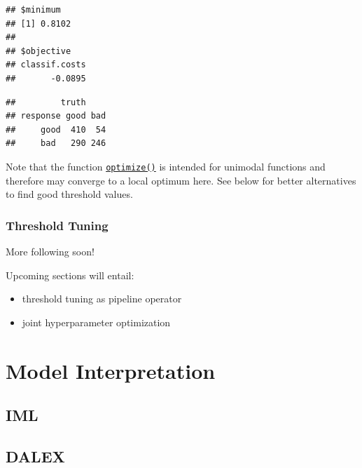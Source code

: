 \documentclass[]{scrbook}
\newenvironment{Shaded}{\begin{snugshade}}{\end{snugshade}}
\newcommand{\CommentTok}[1]{\textcolor[rgb]{0.56,0.35,0.01}{\textit{#1}}}
\newcommand{\KeywordTok}[1]{\textcolor[rgb]{0.13,0.29,0.53}{\textbf{#1}}}
\newcommand{\NormalTok}[1]{#1}
\newcommand{\OperatorTok}[1]{\textcolor[rgb]{0.81,0.36,0.00}{\textbf{#1}}}
\providecommand{\tightlist}{%
  \setlength{\itemsep}{0pt}\setlength{\parskip}{0pt}}
\renewenvironment{Shaded} {\begin{snugshade}\small} {\end{snugshade}}
\begin{document}
\begin{verbatim}
## $minimum
## [1] 0.8102
## 
## $objective
## classif.costs 
##       -0.0895
\end{verbatim}

\begin{Shaded}
\end{Shaded}

\begin{verbatim}
##         truth
## response good bad
##     good  410  54
##     bad   290 246
\end{verbatim}

Note that the function \href{https://www.rdocumentation.org/packages/stats/topics/optimize}{\texttt{optimize()}} is intended for unimodal functions and therefore may converge to a local optimum here.
See below for better alternatives to find good threshold values.

\hypertarget{threshold-tuning}{%
\subsection{Threshold Tuning}\label{threshold-tuning}}

More following soon!

Upcoming sections will entail:

\begin{itemize}
\tightlist
\item
  threshold tuning as pipeline operator
\item
  joint hyperparameter optimization
\end{itemize}

\hypertarget{interpretation}{%
\chapter{Model Interpretation}\label{interpretation}}

\hypertarget{iml}{%
\section{IML}\label{iml}}

\hypertarget{interpretability-dalex}{%
\section{DALEX}\label{interpretability-dalex}}
\end{document}
